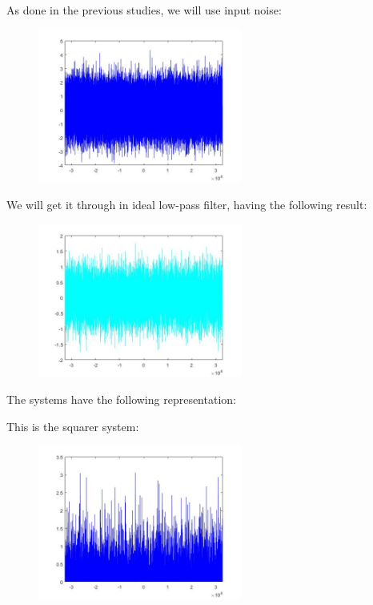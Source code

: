 \documentclass[a4paper,11pt]{article}
\begin{document}
\newpage

As done in the previous studies, we will use input noise:

\begin{figure}[!hp]
    \begin{center}
    \includegraphics[width=0.6\textwidth]{images/lab3_figure1_1.jpg}
    \end{center}
\end{figure}

We will get it through in ideal low-pass filter, having the following result:

\begin{figure}[!hp]
    \begin{center}
    \includegraphics[width=0.6\textwidth]{images/lab3_figure1_2.jpg}
    \end{center}
\end{figure}

\newpage

The systems have the following representation:

This is the squarer system:

\begin{figure}[!hp]
    \begin{center}
    \includegraphics[width=0.6\textwidth]{images/lab3_figure2_1.jpg}
    \end{center}
\end{figure}
\end{document}

